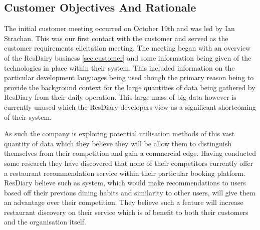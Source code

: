 \documentclass{l3proj}
\begin{document}

\subsection{Customer Objectives And Rationale}
\label{sec:custobjectives}


The initial customer meeting occurred on October 19th and was led by Ian Strachan. This was our first contact with the customer and served as the customer requirements elicitation meeting. The meeting began with an overview of the ResDairy business \ref{sec:customer} and some information being given of the technologies in place within their system. This included information on the particular development languages being used though the primary reason being to provide the background context for the large quantities of data being gathered by ResDiary from their daily operation. This large mass of big data however is currently unused which the ResDiary developers view as a significant shortcoming of their system. 

As such the company is exploring potential utilisation methods of this vast quantity of data which they believe they will be allow them to distinguish themselves from their competition and gain a commercial edge. Having conducted some research they have discovered that none of their competitors currently offer a restaurant recommendation service within their particular booking platform. ResDiary believe such as system, which would make recommendations to users based off their previous dining habits and similarity to other users, will give them an advantage over their competition. They believe such a feature will increase restaurant discovery on their service which is of benefit to both their customers and the organisation itself.
\end{document}
